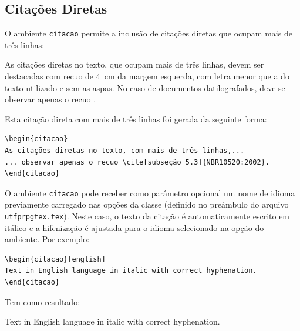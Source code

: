 \subsection{Citações Diretas}\label{sec:citacoesdiretas}

O ambiente \texttt{citacao} permite a inclusão de citações diretas que ocupam mais de três linhas:

\begin{citacao}%
As citações diretas no texto, que ocupam mais de três linhas, devem ser destacadas com recuo de \SI{4}{cm} da margem esquerda, com letra menor que a do texto utilizado e sem as aspas. No caso de documentos datilografados, deve-se observar apenas o recuo \cite[subseção 5.3]{NBR10520:2002}.
\end{citacao}

\noindent Esta citação direta com mais de três linhas foi gerada da seguinte forma:

\begin{SingleSpacing}%
\begin{verbatim}
\begin{citacao}
As citações diretas no texto, com mais de três linhas,...
... observar apenas o recuo \cite[subseção 5.3]{NBR10520:2002}.
\end{citacao}
\end{verbatim}
\end{SingleSpacing}

O ambiente \texttt{citacao} pode receber como parâmetro opcional um nome de idioma previamente carregado nas opções da classe (definido no preâmbulo do arquivo \texttt{utfprpgtex.tex}). Neste caso, o texto da citação é automaticamente escrito em itálico e a hifenização é ajustada para o idioma selecionado na opção do ambiente. Por exemplo:

\begin{SingleSpacing}%
\begin{verbatim}
\begin{citacao}[english]
Text in English language in italic with correct hyphenation.
\end{citacao}
\end{verbatim}
\end{SingleSpacing}

\noindent Tem como resultado:

\begin{citacao}[english]%
Text in English language in italic with correct hyphenation.
\end{citacao}

